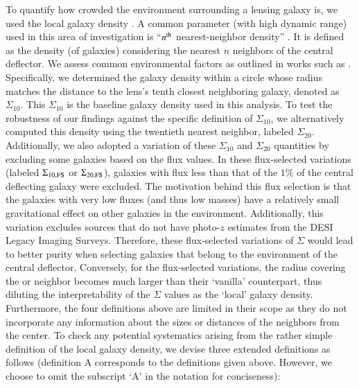 \documentclass{aa}
\newcommand{\newedit}[1]{{#1}} %
\begin{document}
To quantify how crowded the environment surrounding a lensing galaxy is, we used the local galaxy density \citep{Dressler80, Cooper05}. A common parameter (with high dynamic range) used in this area of investigation is ``$n^{\rm th}$ nearest-neighbor density'' \citep{Treu09}. It is defined as the density (of galaxies) considering the nearest $n$ neighbors of the central deflector. We assess common environmental factors as outlined in works such as \citet{Cooper05}. Specifically, we determined the galaxy density within a circle whose radius matches the distance to the lens's tenth closest neighboring galaxy, denoted as $\Sigma_{10}$\citep[as described by ][]{Dressler80}. This  $\Sigma_{10}$ is the baseline galaxy density used in this analysis. To test the robustness of our findings against the specific definition of $\Sigma_{10}$, we alternatively computed this density using the twentieth nearest neighbor, labeled $\Sigma_{20}$. Additionally, we also adopted a variation of these  $\Sigma_{10}$ and  $\Sigma_{20}$ quantities by excluding some galaxies based on the flux values. In these flux-selected variations (labeled $\Sigma_{10, \rm FS}$ or $\Sigma_{20, \rm FS}$), galaxies with flux less than that of the $1\%$ of the central deflecting galaxy were excluded. The motivation behind this flux selection is that the galaxies with very low fluxes (and thus low masses) have a relatively small gravitational effect on other galaxies in the environment. \newedit{Additionally, this variation excludes sources that do not have photo-$z$ estimates from the DESI Legacy Imaging Surveys. Therefore, these flux-selected variations of $\Sigma$ would lead to better purity when selecting galaxies that belong to the environment of the central deflector.} \newedit{Conversely, for the flux-selected variations, the radius covering the \nth{10} or \nth{20} neighbor becomes much larger than their `vanilla' counterpart, thus diluting the interpretability of the $\Sigma$ values as the `local' galaxy density.} Furthermore, the four definitions above are limited in their scope as they do not incorporate any information about the sizes or distances of the neighbors from the center. To check any potential systematics arising from the rather simple definition of the local galaxy density, we devise three extended definitions as follows (definition A corresponds to the definitions given above. However, we choose to omit the subscript `A' in the notation for conciseness):
\end{document}
